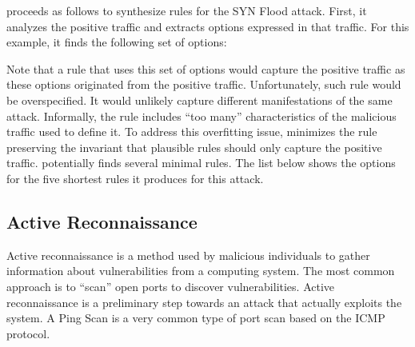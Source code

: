\documentclass[runningheads]{llncs}
\begin{document}
\tname{} proceeds as follows to synthesize rules for the SYN Flood
attack. First, it analyzes the positive traffic and extracts options
expressed in that traffic. For this example, it finds the following
set of options:

\begin{figure}[h]
  \vspace{-3ex}
  
  \vspace{-3ex}  
\end{figure}

Note that a rule that uses this set of options would capture the
positive traffic as these options originated from the positive
traffic. Unfortunately, such rule would be overspecified. It would
unlikely capture different manifestations of the same
attack. Informally, the rule includes ``too many'' characteristics of
the malicious traffic used to define it. To address this overfitting
issue, \tname{} minimizes the rule preserving the invariant that
plausible rules should only capture the positive traffic. \tname{}
potentially finds several minimal rules. The list below shows the
options for the five shortest rules it produces for this attack.


\subsection{Active Reconnaissance}

Active reconnaissance is a method used by malicious individuals to
gather information about vulnerabilities from a computing system. The
most common approach is to ``scan'' open ports to discover
vulnerabilities. Active reconnaissance is a preliminary step towards
an attack that actually exploits the system. A Ping Scan is a very
common type of port scan based on the ICMP
protocol. 



\subsection{}
\label{sec:content-example}

\end{document}

